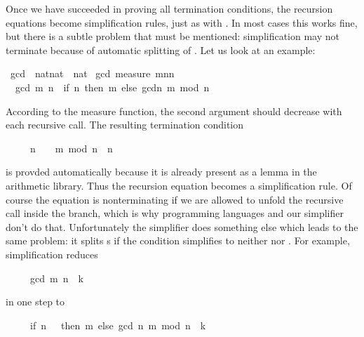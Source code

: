 %
\begin{isabellebody}%
\def\isabellecontext{simplification}%
%
\begin{isamarkuptext}%
Once we have succeeded in proving all termination conditions, the recursion
equations become simplification rules, just as with
. In most cases this works fine, but there is a subtle
problem that must be mentioned: simplification may not
terminate because of automatic splitting of .
Let us look at an example:%
\end{isamarkuptext}%
\ gcd\ {\isacharcolon}{\isacharcolon}\ {\isachardoublequote}nat{\isasymtimes}nat\ {\isasymRightarrow}\ nat{\isachardoublequote}\isanewline
{}\ gcd\ {\isachardoublequote}measure\ {\isacharparenleft}{\isasymlambda}{\isacharparenleft}m{\isacharcomma}n{\isacharparenright}{\isachardot}n{\isacharparenright}{\isachardoublequote}\isanewline
\ \ {\isachardoublequote}gcd\ {\isacharparenleft}m{\isacharcomma}\ n{\isacharparenright}\ {\isacharequal}\ {\isacharparenleft}if\ n{\isacharequal}\ then\ m\ else\ gcd{\isacharparenleft}n{\isacharcomma}\ m\ mod\ n{\isacharparenright}{\isacharparenright}{\isachardoublequote}%
\begin{isamarkuptext}%
\noindent
According to the measure function, the second argument should decrease with
each recursive call. The resulting termination condition
\begin{isabelle}%
\ \ \ \ \ n\ {\isasymnoteq}\ \ {\isasymLongrightarrow}\ m\ mod\ n\ {\isacharless}\ n%
\end{isabelle}
is provded automatically because it is already present as a lemma in the
arithmetic library. Thus the recursion equation becomes a simplification
rule. Of course the equation is nonterminating if we are allowed to unfold
the recursive call inside the  branch, which is why programming
languages and our simplifier don't do that. Unfortunately the simplifier does
something else which leads to the same problem: it splits s if the
condition simplifies to neither  nor . For
example, simplification reduces
\begin{isabelle}%
\ \ \ \ \ gcd\ {\isacharparenleft}m{\isacharcomma}\ n{\isacharparenright}\ {\isacharequal}\ k%
\end{isabelle}
in one step to
\begin{isabelle}%
\ \ \ \ \ {\isacharparenleft}if\ n\ {\isacharequal}\ \ then\ m\ else\ gcd\ {\isacharparenleft}n{\isacharcomma}\ m\ mod\ n{\isacharparenright}{\isacharparenright}\ {\isacharequal}\ k%

\end{isabelle}
\end{isamarkuptext}
\end{isabellebody}
